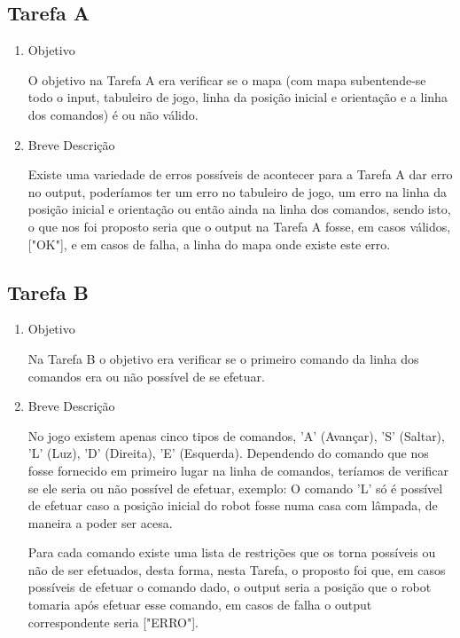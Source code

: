 \documentclass[a4paper, 12pt, portuguese]{article}
\begin{document}
\subsection{Tarefa A}
\begin{enumerate}
\item Objetivo

O objetivo na Tarefa A era verificar se o mapa (com mapa subentende-se todo o input, tabuleiro de jogo, linha da posição inicial e orientação e a linha dos comandos) é ou não válido.

\item Breve Descrição

Existe uma variedade de erros possíveis de acontecer para a Tarefa A dar erro no output, poderíamos ter um erro no tabuleiro de jogo, um erro na linha da posição inicial e orientação ou então ainda na linha dos comandos, sendo isto, o que nos foi proposto seria que o output na Tarefa A fosse, em casos válidos, ["OK"], e em casos de falha, a linha do mapa onde existe este erro. 

\end{enumerate}

\subsection{Tarefa B}
\begin{enumerate}
\item Objetivo

Na Tarefa B o objetivo era verificar se o primeiro comando da linha dos comandos era ou não possível de se efetuar.

\item Breve Descrição

No jogo existem apenas cinco tipos de comandos, 'A' (Avançar), 'S' (Saltar), 'L' (Luz), 'D' (Direita), 'E' (Esquerda). Dependendo do comando que nos fosse fornecido em primeiro lugar na linha de comandos, teríamos de verificar se ele seria ou não possível de efetuar, exemplo: O comando 'L' só é possível de efetuar caso a posição inicial do robot fosse numa casa com lâmpada, de maneira a poder ser acesa.

Para cada comando existe uma lista de restrições que os torna possíveis ou não de ser efetuados, desta forma, nesta Tarefa, o proposto foi que, em casos possíveis de efetuar o comando dado, o output seria a posição que o robot tomaria após efetuar esse comando, em casos de falha o output correspondente seria ["ERRO"].

\end{enumerate}
\end{document}
